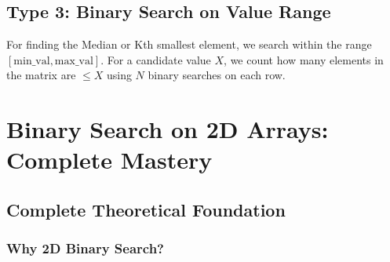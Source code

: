 \documentclass[11pt,a4paper,oneside]{book}
\begin{document}
\subsection{Type 3: Binary Search on Value Range}
For finding the Median or Kth smallest element, we search within the range $[\text{min\_val}, \text{max\_val}]$. For a candidate value $X$, we count how many elements in the matrix are $\leq X$ using $N$ binary searches on each row.

\section{Binary Search on 2D Arrays: Complete Mastery}

\subsection{Complete Theoretical Foundation}

\subsubsection{Why 2D Binary Search?}
\end{document}
